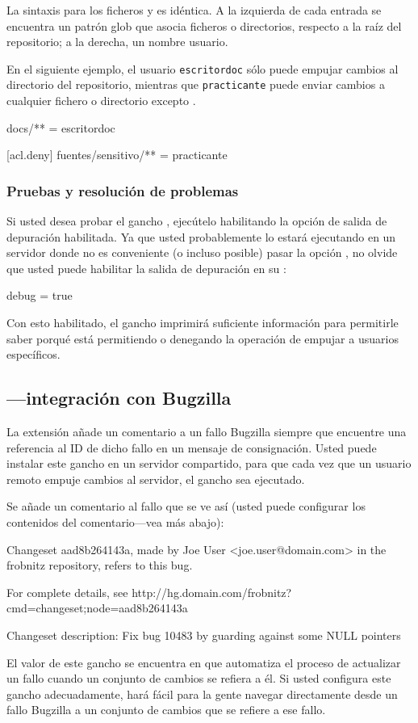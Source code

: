 La sintaxis para los ficheros  y
 es idéntica. A la izquierda de cada entrada se
encuentra un patrón glob que asocia ficheros o directorios, respecto a
la raíz del repositorio; a la derecha, un nombre usuario.

En el siguiente ejemplo, el usuario \texttt{escritordoc} sólo puede
empujar cambios al directorio  del repositorio, mientras
que \texttt{practicante} puede enviar cambios a cualquier fichero o
directorio excepto .
\begin{codesample2}
  docs/** = escritordoc

  [acl.deny]
  fuentes/sensitivo/** = practicante
\end{codesample2}

\subsubsection{Pruebas y resolución de problemas}

Si usted desea probar el gancho , ejecútelo habilitando la
opción de salida de depuración habilitada. Ya que usted probablemente
lo estará ejecutando en un servidor donde no es conveniente (o incluso
posible) pasar la opción , no olvide que usted puede
habilitar la salida de depuración en su \hgrc:
\begin{codesample2}
  [ui]
  debug = true
\end{codesample2}
Con esto habilitado, el gancho  imprimirá suficiente
información para permitirle saber porqué está permitiendo o denegando
la operación de empujar a usuarios específicos.

\subsection{---integración con Bugzilla}

La extensión  añade un comentario a un fallo Bugzilla
siempre que encuentre una referencia al ID de dicho fallo en un
mensaje de consignación. Usted puede instalar este gancho en un
servidor compartido, para que cada vez que un usuario remoto empuje
cambios al servidor, el gancho sea ejecutado.

Se añade un comentario al fallo que se ve así (usted puede configurar
los contenidos del comentario---vea más abajo):
\begin{codesample2}
  Changeset aad8b264143a, made by Joe User <joe.user@domain.com> in
  the frobnitz repository, refers to this bug.

  For complete details, see
  http://hg.domain.com/frobnitz?cmd=changeset;node=aad8b264143a

  Changeset description:
        Fix bug 10483 by guarding against some NULL pointers
\end{codesample2}
El valor de este gancho se encuentra en que automatiza el proceso de
actualizar un fallo cuando un conjunto de cambios se refiera a él. Si
usted configura este gancho adecuadamente, hará fácil para la gente
navegar directamente desde un fallo Bugzilla a un conjunto de cambios
que se refiere a ese fallo.

